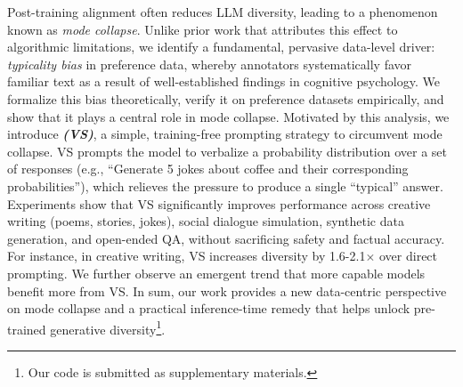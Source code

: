 {Post-training alignment often reduces LLM diversity, leading to a phenomenon known as \emph{mode collapse}}. Unlike prior work that attributes this effect to algorithmic limitations, we identify a fundamental, pervasive data-level driver: \emph{typicality bias} in preference data, whereby annotators systematically favor familiar text as a result of well-established findings in cognitive psychology. We formalize this bias theoretically, verify it on preference datasets empirically, and show that it plays a central role in mode collapse. Motivated by this analysis, we introduce \emph{\textbf{\ours (VS)}}, a simple, training-free prompting strategy to circumvent mode collapse. VS prompts the model to verbalize a probability distribution over a set of responses (e.g., ``Generate 5 jokes about coffee and their corresponding probabilities''), which relieves the pressure to produce a single ``typical'' answer. Experiments show that VS significantly improves performance across creative writing (poems, stories, jokes), social dialogue simulation, synthetic data generation, and open-ended QA, without sacrificing safety and factual accuracy. For instance, in creative writing, VS increases diversity by 1.6-2.1$\times$ over direct prompting. 
We further observe an emergent trend that more capable models benefit more from VS.
In sum, our work provides a new data-centric perspective on mode collapse and a practical inference-time remedy that helps unlock pre-trained generative diversity\footnote{Our code is submitted as supplementary materials.}. 



